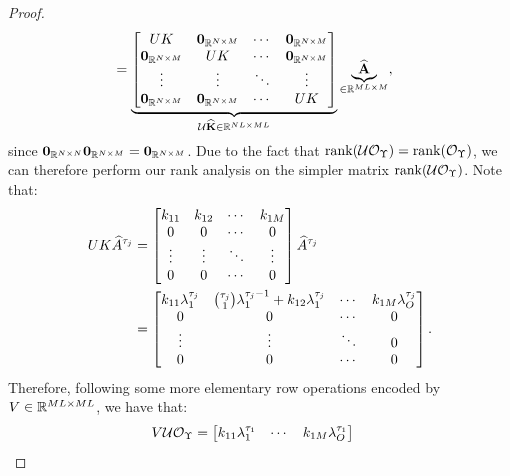 \begin{proof}
\begin{align*}
	&=  
	\underbrace{
		\begin{bmatrix}
		UK   & \mathbf{0}_{\mathbb{R}^{N\times M}} & \cdots & \mathbf{0}_{\mathbb{R}^{N\times M}}\\
		\mathbf{0}_{\mathbb{R}^{N\times M}} & UK   & \cdots & \mathbf{0}_{\mathbb{R}^{N\times M}}\\
		\vdots  & \vdots  & \ddots & \vdots\\
		\mathbf{0}_{\mathbb{R}^{N\times M}} & \mathbf{0}_{\mathbb{R}^{N\times M}} & \cdots & UK
		\end{bmatrix}}_{\mathcal{U}\widehat{\mathbf{K}}\in\mathbb{R}^{NL\times ML}}
	\underbrace{\widehat{\mathbf{A}}}_{\in\mathbb{R}^{ML\times M}},
	\end{align*}
	since $\mathbf{0}_{\mathbb{R}^{N\times N}}\mathbf{0}_{\mathbb{R}^{N\times M}} = \mathbf{0}_{\mathbb{R}^{N\times M}}$. Due to the fact that $\operatorname{rank}(\mathcal{U}\mathcal{O}_{\Upsilon}) = \operatorname{rank}(\mathcal{O}_{\Upsilon})$,
	we can therefore perform our rank analysis on the simpler matrix $\operatorname{rank}(\mathcal{U}\mathcal{O}_{\Upsilon})$. Note that:
	\begin{align*}
	UK \widehat{A}^{\tau_j} &=  
	\begin{bmatrix}
	k_{11} & k_{12} & \cdots & k_{1M}\\
	0 & 0 & \cdots & 0\\
	\vdots & \vdots & \ddots & \vdots\\
	0 & 0 & \cdots & 0
	\end{bmatrix}
	\widehat{A}^{\tau_j}\\
	&= 
	\begin{bmatrix}
	k_{11}\lambda_1^{\tau_j} & \binom{\tau_j}{1}\lambda_1^{\tau_j-1} + k_{12}\lambda_1^{\tau_j}  & \cdots & k_{1M}\lambda_{O}^{\tau_j}\\
	0 & 0 & \cdots & 0\\
	\vdots & \vdots & \ddots & 0\\
	0 & 0 & \cdots & 0
	\end{bmatrix}.  
	\end{align*}
	Therefore, following some more elementary row operations encoded by $V\in\mathbb{R}^{ML\times ML}$, we have that:
	\begin{align*}
	V \mathcal{U}\mathcal{O}_{\Upsilon}
	&= 
	\begin{bmatrix}
	k_{11}\lambda_1^{\tau_1} & \cdots & k_{1M}\lambda_{O}^{\tau_1}\\

\end{bmatrix}
\end{align*}
\end{proof}
